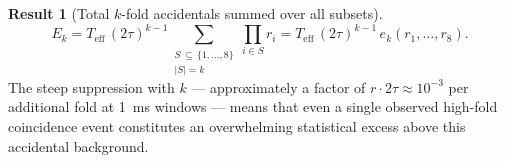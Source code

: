 \documentclass[12pt]{article}
\theoremstyle{definition}
\newtheorem{result}{Result}
\newcommand{\Teff}{T_{\!\text{eff}}}
\newcommand{\Eacc}[1]{E_{#1}}
\begin{document}
\begin{result}[Total $k$-fold accidentals summed over all subsets]
\[
    \Eacc{k}
    = \Teff\,(2\tau)^{k-1}
      \sum_{\substack{S\,\subseteq\,\{1,\ldots,8\}\\ |S|=k}}
      \prod_{i\in S} r_i
    = \Teff\,(2\tau)^{k-1}\,e_k(r_1,\ldots,r_8).
    \tag{6.3}
\]
The steep suppression with $k$ — approximately a factor of $r\cdot 2\tau
\approx 10^{-3}$ per additional fold at 1~ms windows — means that even a
single observed high-fold coincidence event constitutes an overwhelming
statistical excess above this accidental background.
\end{result}
\end{document}
